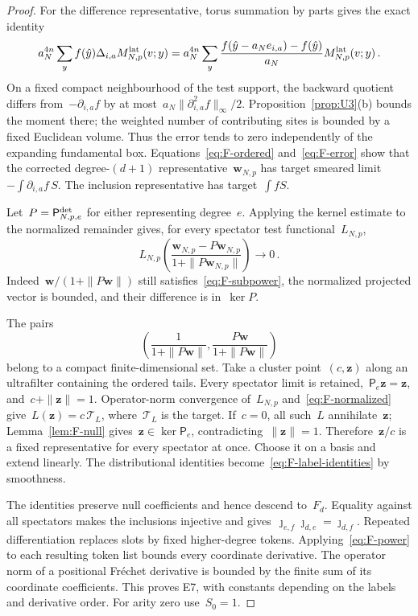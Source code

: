 \begin{proof}
For the difference representative, torus summation by parts gives the exact identity
\begin{equation}\label{eq:F-sbp}
a_N^{4n}\sum_y f(\hat y)\Delta_{i,a}M^{\mathrm{lat}}_{N,p}(v;y)
=a_N^{4n}\sum_y\frac{f(\hat y-a_Ne_{i,a})-f(\hat y)}{a_N}M^{\mathrm{lat}}_{N,p}(v;y)\,.
\end{equation}
On a fixed compact neighbourhood of the test support, the backward quotient differs from~$-\partial_{i,a}f$ by at most~$a_N\|\partial_{i,a}^2f\|_\infty/2$. Proposition~\ref{prop:U3}(b) bounds the moment there; the weighted number of contributing sites is bounded by a fixed Euclidean volume. Thus the error tends to zero independently of the expanding fundamental box. Equations~\eqref{eq:F-ordered} and~\eqref{eq:F-error} show that the corrected degree-$(d+1)$ representative~$\mathbf w_{N,p}$ has target smeared limit~$-\int\partial_{i,a}f\,S$. The inclusion representative has target~$\int fS$.

Let~$P=\mathsf P^{\rm det}_{N,p,e}$ for either representing degree~$e$. Applying the kernel estimate to the normalized remainder gives, for every spectator test functional~$L_{N,p}$,
\begin{equation}\label{eq:F-normalized}
L_{N,p}\left(\frac{\mathbf w_{N,p}-P\mathbf w_{N,p}}{1+\|P\mathbf w_{N,p}\|}\right)\longrightarrow0\,.
\end{equation}
Indeed~$\mathbf w/(1+\|P\mathbf w\|)$ still satisfies~\eqref{eq:F-subpower}, the normalized projected vector is bounded, and their difference is in~$\ker P$.

The pairs
\begin{equation*}
\left(\frac1{1+\|P\mathbf w\|},\frac{P\mathbf w}{1+\|P\mathbf w\|}\right)
\end{equation*}
belong to a compact finite-dimensional set. Take a cluster point~$(c,\mathbf z)$ along an ultrafilter containing the ordered tails. Every spectator limit is retained,~$\mathsf P_e\mathbf z=\mathbf z$, and~$c+\|\mathbf z\|=1$. Operator-norm convergence of~$L_{N,p}$ and~\eqref{eq:F-normalized} give~$L(\mathbf z)=c\,\mathcal T_L$, where~$\mathcal T_L$ is the target. If~$c=0$, all such~$L$ annihilate~$\mathbf z$; Lemma~\ref{lem:F-null} gives~$\mathbf z\in\ker\mathsf P_e$, contradicting~$\|\mathbf z\|=1$. Therefore~$\mathbf z/c$ is a fixed representative for every spectator at once. Choose it on a basis and extend linearly. The distributional identities become~\eqref{eq:F-label-identities} by smoothness.

The identities preserve null coefficients and hence descend to~$F_d$. Equality against all spectators makes the inclusions injective and gives~$\jmath_{e,f}\jmath_{d,e}=\jmath_{d,f}$. Repeated differentiation replaces slots by fixed higher-degree tokens. Applying~\eqref{eq:F-power} to each resulting token list bounds every coordinate derivative. The operator norm of a positional Fr\'echet derivative is bounded by the finite sum of its coordinate coefficients. This proves E7, with constants depending on the labels and derivative order. For arity zero use~$S_0=1$.
\end{proof}

